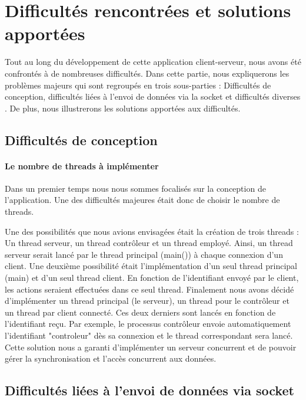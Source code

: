 \chapter{Difficultés rencontrées et solutions apportées} \label{Difficultés}

Tout au long du développement de cette application client-serveur, nous avons été confrontés à de nombreuses difficultés. Dans cette partie, nous expliquerons les problèmes majeurs qui sont regroupés en trois sous-parties : Difficultés de conception, difficultés liées à l'envoi de données via la socket et difficultés diverses . De plus, nous illustrerons les solutions apportées aux difficultés.

\section{Difficultés de conception}

\subsubsection{Le nombre de threads à implémenter}

Dans un premier temps nous nous sommes focalisés sur la conception de l'application. Une des difficultés majeures était donc de choisir le nombre de threads.

Une des possibilités que nous avions envisagées était la création de trois threads : Un thread serveur, un thread contrôleur et un thread employé. Ainsi, un thread serveur serait lancé par le thread principal (main()) à chaque connexion d'un client.
Une deuxième possibilité était l'implémentation d'un seul thread principal (main) et d'un seul thread client. En fonction de l'identifiant envoyé par le client, les actions seraient effectuées dans ce seul thread. 
Finalement nous avons décidé d'implémenter un thread principal (le serveur), un thread pour le contrôleur et un thread par client connecté. Ces deux derniers sont lancés en fonction de l'identifiant reçu. Par exemple, le processus contrôleur envoie automatiquement l'identifiant "controleur" dès sa connexion et le thread correspondant sera lancé. Cette solution nous a garanti d'implémenter un serveur concurrent et de pouvoir gérer la synchronisation et l'accès concurrent aux données.\\ 

\section{Difficultés liées à l'envoi de données via socket}


